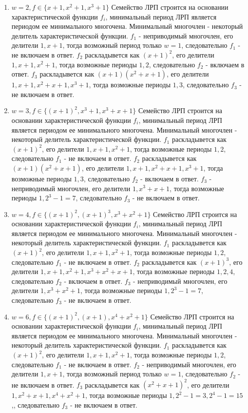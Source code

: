 \documentclass[utf8x, 14pt]{G7-32} %
\begin{document}
\begin{enumerate}
    \item $w=2, f\in \{x+1, x^2+1, x^3+1\}$
    Семейство ЛРП строится на основании характеристической функции $f_i$, минимальный период ЛРП является периодом ее минимального многочена. Минимальный многочлен - некоторый делитель характеристической функции. $f_1$ - неприводимый многочлен, его делители $1, x+1$, тогда возможный период только $w=1$, следовательно $f_1$ - не включаем в ответ. $f_2$ раскладывется как $(x+1)^2$, его делители $1, x+1, x^2+1$, тогда возможные периоды $1, 2$, следовательно $f_2$ - включаем в ответ. $f_3$ раскладывется как $(x+1)(x^2+x+1)$, его делители $1, x+1, x^2+x+1, x^3+1$, тогда возможные периоды $1, 3$, следовательно $f_3$ - не включаем в ответ. 
    
    \item $w=3, f\in \{(x+1)^2, x^3+1, x^3+x+1\}$
    Семейство ЛРП строится на основании характеристической функции $f_i$, минимальный период ЛРП является периодом ее минимального многочена. Минимальный многочлен - некоторый делитель характеристической функции. $f_1$ раскладывется как $(x+1)^2$, его делители $1, x+1, x^2+1$, тогда возможные периоды $1, 2$, следовательно $f_1$ - не включаем в ответ. $f_2$ раскладывется как $(x+1)(x^2+x+1)$, его делители $1, x+1, x^2+x+1, x^3+1$, тогда возможные периоды $1, 3$, следовательно $f_2$ - включаем в ответ. $f_3$ - неприводимый многочлен, его делители $1, x^3+x+1$, тогда возможные периоды $1, 2^3-1=7$, следовательно $f_3$ - не включаем в ответ. 
    
    \item $w=4, f\in \{(x+1)^2, (x+1)^3, x^3+x^2+1\}$
    Семейство ЛРП строится на основании характеристической функции $f_i$, минимальный период ЛРП является периодом ее минимального многочена. Минимальный многочлен - некоторый делитель характеристической функции. $f_1$ раскладывется как $(x+1)^2$, его делители $1, x+1, x^2+1$, тогда возможные периоды $1, 2$, следовательно $f_1$ - не включаем в ответ. $f_2$ раскладывется как $(x+1)^3$, его делители $1, x+1, x^2+1, x^3+x^2+x+1$, тогда возможные периоды $1, 2, 4$, следовательно $f_2$ - включаем в ответ. $f_3$ - неприводимый многочлен, его делители $1, x^3+x^2+1$, тогда возможные периоды $1, 2^3-1=7$, следовательно $f_3$ - не включаем в ответ. 
    
    \item $w=6, f\in \{(x+1)^2, (x+1), x^4+x^2+1\}$
    Семейство ЛРП строится на основании характеристической функции $f_i$, минимальный период ЛРП является периодом ее минимального многочена. Минимальный многочлен - некоторый делитель характеристической функции. $f_1$ раскладывется как $(x+1)^2$, его делители $1, x+1, x^2+1$, тогда возможные периоды $1, 2$, следовательно $f_1$ - не включаем в ответ. $f_2$ - неприводимый многочлен, его делители $1, x+1$, тогда возможный период только $w=1$, следовательно $f_2$ - не включаем в ответ. $f_3$ раскладывется как $(x^2+x+1)^2$, его делители $1, x^2+x+1, x^4+x^2+1$, тогда возможные периоды $1, 2^2-1=3, 2^4-1=15$,, следовательно $f_3$ - не включаем в ответ. 
    

\end{enumerate}
\end{document}
